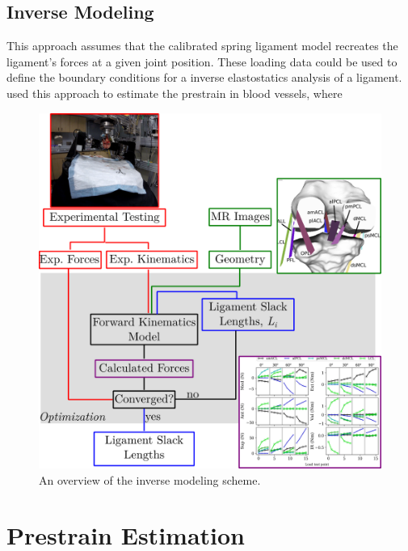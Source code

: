 \subsection*{Inverse Modeling}
This approach assumes that the calibrated spring ligament model recreates the ligament's forces at a given joint position. These loading data could be used to define the boundary conditions for a inverse elastostatics analysis of a ligament. \cite{lu_computational_2007} used this approach to estimate the prestrain in blood vessels, where 

\begin{figure}
    \centering
    \includegraphics[width=0.75\linewidth]{../img/InverseModelingFlowChart.png}
    \caption{An overview of the inverse modeling scheme.}
    \label{fig:inverseModelingScheme}
\end{figure}

\section*{Prestrain Estimation}

